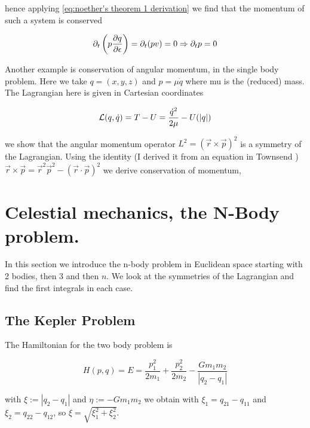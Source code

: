 \documentclass[12pt]{article}
\begin{document}
hence applying \eqref{eq:noether's theorem 1 derivation} we find that the momentum of such a system is conserved

\begin{equation}\label{eq:momentum conserved}
    \partial_t \left(p\frac{\partial q}{\partial \epsilon}\right) = \partial_t (pv) = 0 \Rightarrow \partial_t p = 0
\end{equation}

 Another example is conservation of angular momentum, in the single body problem. Here we take $q = (x,y,z)$ and $p = \mu \dot q$ where mu is the (reduced) mass. The Lagrangian here is given in Cartesian coordinates 

\begin{equation}\label{eq:lagrangian one body problem}
    \mathcal L(q,\dot q) = T - U = \frac{\dot q^2}{2\mu} - U(|q|)
\end{equation}

we show that the angular momentum operator $L^2 = \left(\vec r\times \vec p\right)^2$ is a symmetry of the Lagrangian. Using the identity (I derived it from an equation in Townsend \cite{Townsend}) $\vec r\times\vec p = \vec r^2\vec p^2 - (\vec r\cdot \vec p)^2$ we derive conservation of momentum, 

\section{Celestial mechanics, the N-Body problem.}

In this section we introduce the n-body problem in Euclidean space starting with 2 bodies, then 3 and then $n$. We look at the symmetries of the Lagrangian and find the first integrals in each case. 

\subsection{The Kepler Problem}

The Hamiltonian for the two body problem is

\begin{equation}\label{eq:hamiltonian kepler}
    H(p,q) = E = \frac{p_1^2}{2m_1} + \frac{p_2^2}{2m_2} - \frac{G m_1m_2}{|q_2-q_1|}
\end{equation}

with $\xi := |q_2-q_1|$ and $\eta := -Gm_1m_2$ we obtain with $\xi_1 = q_{21} - q_{11}$ and $\xi_2 = q_{22} - q_{12}$, so $\xi = \sqrt{\xi_1^2 + \xi_2^2}$. 
\end{document}
